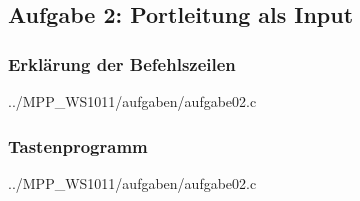 \subsection*{Aufgabe 2: Portleitung als Input}

\subsubsection*{Erklärung der Befehlszeilen}

{../MPP_WS1011/aufgaben/aufgabe02.c}

\subsubsection*{Tastenprogramm}

{../MPP_WS1011/aufgaben/aufgabe02.c}
